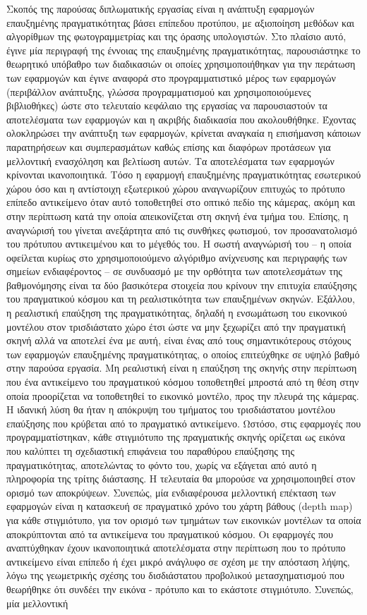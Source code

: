 Σκοπός της παρούσας διπλωματικής εργασίας είναι η ανάπτυξη εφαρμογών επαυξημένης πραγματικότητας βάσει επίπεδου προτύπου, με αξιοποίηση μεθόδων και αλγορίθμων της φωτογραμμετρίας και της όρασης υπολογιστών. Στο πλαίσιο αυτό, έγινε μία περιγραφή της έννοιας της επαυξημένης πραγματικότητας, παρουσιάστηκε το θεωρητικό υπόβαθρο των διαδικασιών οι οποίες χρησιμοποιήθηκαν για την περάτωση των εφαρμογών και έγινε αναφορά στο προγραμματιστικό μέρος των εφαρμογών (περιβάλλον ανάπτυξης, γλώσσα προγραμματισμού και χρησιμοποιούμενες βιβλιοθήκες) ώστε στο τελευταίο κεφάλαιο της εργασίας να παρουσιαστούν τα αποτελέσματα των εφαρμογών και η ακριβής διαδικασία που ακολουθήθηκε. Έχοντας ολοκληρώσει την ανάπτυξη των εφαρμογών, κρίνεται αναγκαία η επισήμανση κάποιων παρατηρήσεων και συμπερασμάτων καθώς επίσης και διαφόρων προτάσεων για μελλοντική ενασχόληση και βελτίωση αυτών. Τα αποτελέσματα των εφαρμογών κρίνονται ικανοποιητικά. Τόσο η εφαρμογή επαυξημένης πραγματικότητας εσωτερικού χώρου όσο και η αντίστοιχη εξωτερικού χώρου αναγνωρίζουν επιτυχώς το πρότυπο επίπεδο αντικείμενο όταν αυτό τοποθετηθεί στο οπτικό πεδίο της κάμερας, ακόμη και στην περίπτωση κατά την οποία απεικονίζεται στη σκηνή ένα τμήμα του. Επίσης, η αναγνώρισή του γίνεται ανεξάρτητα από τις συνθήκες φωτισμού, τον προσανατολισμό του πρότυπου αντικειμένου και το μέγεθός του. Η σωστή αναγνώρισή του – η οποία οφείλεται κυρίως στο χρησιμοποιούμενο αλγόριθμο ανίχνευσης και περιγραφής των σημείων ενδιαφέροντος – σε συνδυασμό με την ορθότητα των αποτελεσμάτων της βαθμονόμησης είναι τα δύο βασικότερα στοιχεία που κρίνουν την επιτυχία επαύξησης του πραγματικού κόσμου και τη ρεαλιστικότητα των επαυξημένων σκηνών. Εξάλλου, η ρεαλιστική επαύξηση της πραγματικότητας, δηλαδή η ενσωμάτωση του εικονικού μοντέλου στον τρισδιάστατο χώρο έτσι ώστε να μην ξεχωρίζει από την πραγματική σκηνή αλλά να αποτελεί ένα με αυτή, είναι ένας από τους σημαντικότερους στόχους των εφαρμογών επαυξημένης πραγματικότητας, ο οποίος επιτεύχθηκε σε υψηλό βαθμό στην παρούσα εργασία. Μη ρεαλιστική είναι η επαύξηση της σκηνής στην περίπτωση που ένα αντικείμενο του πραγματικού κόσμου τοποθετηθεί μπροστά από τη θέση στην οποία προορίζεται να τοποθετηθεί το εικονικό μοντέλο, προς την πλευρά της κάμερας. Η ιδανική λύση θα ήταν η απόκρυψη του τμήματος του τρισδιάστατου μοντέλου επαύξησης που κρύβεται από το πραγματικό αντικείμενο. Ωστόσο, στις εφαρμογές που προγραμματίστηκαν, κάθε στιγμιότυπο της πραγματικής σκηνής ορίζεται ως εικόνα που καλύπτει τη σχεδιαστική επιφάνεια του παραθύρου επαύξησης της πραγματικότητας, αποτελώντας το φόντο του, χωρίς να εξάγεται από αυτό η πληροφορία της τρίτης διάστασης. Η τελευταία θα μπορούσε να χρησιμοποιηθεί στον ορισμό των αποκρύψεων. Συνεπώς, μία ενδιαφέρουσα μελλοντική επέκταση των εφαρμογών είναι η κατασκευή σε πραγματικό χρόνο του χάρτη βάθους (depth map) για κάθε στιγμιότυπο, για τον ορισμό των τμημάτων των εικονικών μοντέλων τα οποία αποκρύπτονται από τα αντικείμενα του πραγματικού κόσμου. Οι εφαρμογές που αναπτύχθηκαν έχουν ικανοποιητικά αποτελέσματα στην περίπτωση που το πρότυπο αντικείμενο είναι επίπεδο ή έχει μικρό ανάγλυφο σε σχέση με την απόσταση λήψης, λόγω της γεωμετρικής σχέσης του δισδιάστατου προβολικού μετασχηματισμού που θεωρήθηκε ότι συνδέει την εικόνα - πρότυπο και το εκάστοτε στιγμιότυπο. Συνεπώς, μία μελλοντική 